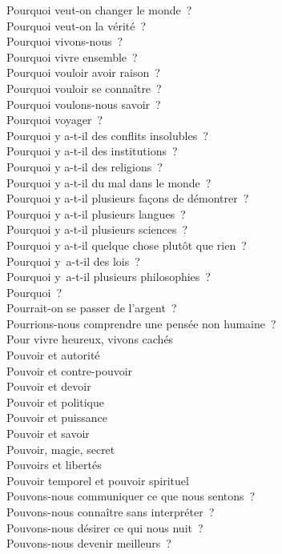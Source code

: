 \documentclass[a4paper,12pt]{article}
\begin{document}
Pourquoi veut-on changer le monde ? \\
Pourquoi veut-on la vérité ? \\
Pourquoi vivons-nous ? \\
Pourquoi vivre ensemble ? \\
Pourquoi vouloir avoir raison ? \\
Pourquoi vouloir se connaître ? \\
Pourquoi voulons-nous savoir ? \\
Pourquoi voyager ? \\
Pourquoi y a-t-il des conflits insolubles ? \\
Pourquoi y a-t-il des institutions ? \\
Pourquoi y a-t-il des religions ? \\
Pourquoi y a-t-il du mal dans le monde ? \\
Pourquoi y a-t-il plusieurs façons de démontrer ? \\
Pourquoi y a-t-il plusieurs langues ? \\
Pourquoi y a-t-il plusieurs sciences ? \\
Pourquoi y a-t-il quelque chose plutôt que rien ? \\
Pourquoi y a-t-il des lois ? \\
Pourquoi y a-t-il plusieurs philosophies ? \\
Pourquoi ? \\
Pourrait-on se passer de l'argent ? \\
Pourrions-nous comprendre une pensée non humaine ? \\
Pour vivre heureux, vivons cachés \\
Pouvoir et autorité \\
Pouvoir et contre-pouvoir \\
Pouvoir et devoir \\
Pouvoir et politique \\
Pouvoir et puissance \\
Pouvoir et savoir \\
Pouvoir, magie, secret \\
Pouvoirs et libertés \\
Pouvoir temporel et pouvoir spirituel \\
Pouvons-nous communiquer ce que nous sentons ? \\
Pouvons-nous connaître sans interpréter ? \\
Pouvons-nous désirer ce qui nous nuit ? \\
Pouvons-nous devenir meilleurs ? \\
\end{document}
